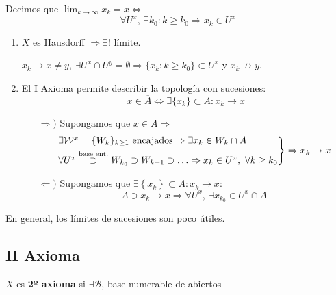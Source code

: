 \begin{defi}[Límites]
Decimos que $\lim_{k \rightarrow \infty} x_k = x \Leftrightarrow$ 
\[
\forall U^x,\ \exists k_0 : k \ge k_0 \Rightarrow x_k \in U^x
\]
\end{defi}
\begin{obs}
\begin{enumerate}
    \item $X$ es Hausdorff $\Rightarrow \exists! $ límite. 
    \begin{demo}    
    $x_k \rightarrow x \neq y,\ \exists U^x \cap U^y = \emptyset \Rightarrow \{x_k : k \ge k_0\} \subset U^x$ y $x_k \not \rightarrow y$.
    \end{demo}

    \item El I Axioma permite describir la topología con sucesiones:
    \[
     x \in \overline{A} \Leftrightarrow \exists \{x_k\} \subset A: x_k \rightarrow x
    \]

    \begin{demo}
    \begin{itemize}
        \item[$\Rightarrow)$] Supongamos que $x \in \overline{A} \Rightarrow$
        \[
        \begin{rcases}
            \exists \mathcal{W}^x = \{W_k\}_{k \ge 1} \text{ encajados} \Rightarrow \exists x_k \in W_k \cap A\\
            \forall U^x \stackrel{\text{base ent.}}{\supset} W_{k_0} \supset W_{k + 1} \supset \ldots \Rightarrow x_k \in U^x,\ \forall k \ge k_0  
        \end{rcases} \Rightarrow x_k \rightarrow x
        \]
        \item[$\Leftarrow)$] Supongamos que $\exists \left\{ x_k \right\} \subset A: x_k \rightarrow x$:
        \[
        A \ni x_k \rightarrow x \Rightarrow \forall U^x,\ \exists x_{k_0} \in U^x \cap A
        \]
    \end{itemize}
    \end{demo}
\end{enumerate}
En general, los límites de sucesiones son poco útiles.
\end{obs}

\subsection{II Axioma}%
\label{sub:iiax}
\begin{defi}[II Ax.]
$X$ es \textbf{2º axioma} si $\exists \mathcal{B}$, base numerable de abiertos
\end{defi}

